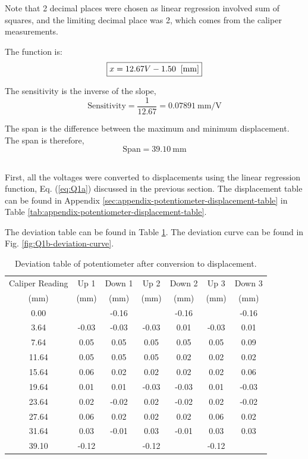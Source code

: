 Note that 2 decimal places were chosen as linear regression involved sum of squares, and the limiting
decimal place was 2, which comes from the caliper measurements.

The function is:
\begin{equation}
    \boxed{x = 12.67V - 1.50  \;\;[\unit[]{mm}]} \label{eq:Q1a}
\end{equation}

The sensitivity is the inverse of the slope, 
\[\boxed{\text{Sensitivity} = \frac{1}{12.67} = \qty{0.07891}{\milli\meter\per\volt}}\]

The span is the difference between the maximum and minimum displacement. The span is therefore,
\[\boxed{\text{Span} = \qty{39.10}{\milli\meter}}\]


\subsection{}

First, all the voltages were converted to displacements using the linear regression function, Eq. (\ref{eq:Q1a}) discussed in the previous section. The
displacement table can be found in Appendix \ref{sec:appendix-potentiometer-displacement-table} in Table \ref{tab:appendix-potentiometer-displacement-table}.

The deviation table can be found in Table \ref{tab:Q1b-deviation-table}. The deviation curve can be found in Fig. \ref{fig:Q1b-deviation-curve}.

\begin{table}[h]
    \centering
    \caption{Deviation table of potentiometer after conversion to displacement.}
    \label{tab:Q1b-deviation-table}
    \begin{tabular}{ccccccc}
        \hline
        Caliper Reading & Up 1 & Down 1 & Up 2 & Down 2 & Up 3 & Down 3 \\
        (mm) & (mm) & (mm) & (mm) & (mm) & (mm) & (mm) \\
        \midrule
        0.00 & & -0.16 & & -0.16 & & -0.16 \\
        3.64 & -0.03 & -0.03 & -0.03 & 0.01 & -0.03 & 0.01 \\
        7.64 & 0.05 & 0.05 & 0.05 & 0.05 & 0.05 & 0.09 \\
        11.64 & 0.05 & 0.05 & 0.05 & 0.02 & 0.02 & 0.02 \\
        15.64 & 0.06 & 0.02 & 0.02 & 0.02 & 0.02 & 0.06 \\
        19.64 & 0.01 & 0.01 & -0.03 & -0.03 & 0.01 & -0.03 \\
        23.64 & 0.02 & -0.02 & 0.02 & -0.02 & 0.02 & -0.02 \\
        27.64 & 0.06 & 0.02 & 0.02 & 0.02 & 0.06 & 0.02 \\
        31.64 & 0.03 & -0.01 & 0.03 & -0.01 & 0.03 & 0.03 \\
        39.10 & -0.12 & & -0.12 & & -0.12 \\
        \hline
    \end{tabular}
\end{table}

